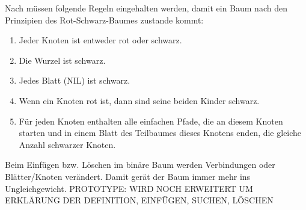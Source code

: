  
Nach \cite[S.311]{tcormen} müssen folgende Regeln eingehalten werden, damit ein Baum nach den Prinzipien des Rot-Schwarz-Baumes zustande kommt:

\begin{enumerate}
	\item Jeder Knoten ist entweder rot oder schwarz.
	\item Die Wurzel ist schwarz.
	\item Jedes Blatt (NIL) ist schwarz.
	\item Wenn ein Knoten rot ist, dann sind seine beiden Kinder schwarz.
	\item Für jeden Knoten enthalten alle einfachen Pfade, die an diesem Knoten starten und in einem Blatt des Teilbaumes dieses Knotens enden, die gleiche Anzahl schwarzer Knoten. 
\end{enumerate}


Beim Einfügen bzw. Löschen im binäre Baum werden Verbindungen oder Blätter/Knoten verändert. Damit gerät der Baum immer mehr ins Ungleichgewicht. 
\newline
\newline
PROTOTYPE: \newline
WIRD NOCH ERWEITERT UM ERKLÄRUNG DER DEFINITION, EINFÜGEN, SUCHEN, LÖSCHEN
\newline
